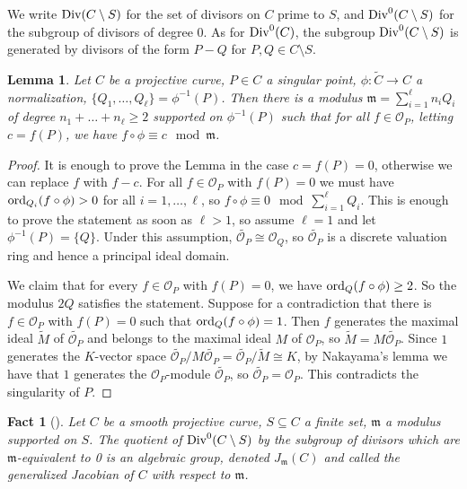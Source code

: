\documentclass{amsart}
\theoremstyle{plain}
\newtheorem{fact}[thm]{Fact}
\newtheorem{lem}[thm]{Lemma}
\theoremstyle{definition}
\newcommand{\Div}{\textnormal{Div}}
\newcommand{\ord}{\textnormal{ord}}
\begin{document}
We write $\Div(C \setminus S)$ for the set of divisors on $C$ prime to $S$, and $\Div^0(C \setminus S)$ for the subgroup of divisors of degree $0$. As for $\Div^0(C)$, the subgroup $\Div^0(C \setminus S)$ is generated by divisors of the form $P-Q$ for $P,Q \in C \setminus S$. 

\begin{lem}\label{lem:existence-modulus}
	Let $C$ be a projective curve, $P \in C$ a singular point, $\phi:\tilde{C} \rightarrow C$ a normalization, $\{Q_1,\dots,Q_\ell\}=\phi^{-1}(P)$. Then there is a modulus $\mathfrak m =   \sum_{i=1}^{\ell} n_i Q_i$ of degree  $n_1+\dots+n_\ell \geq 2$ supported on $\phi^{-1}(P)$ such that for all $f \in \mathcal{O}_P$, letting $c = f(P)$, we have $f \circ \phi  \equiv c \mod  \mathfrak m$.
\end{lem} 

\begin{proof} It is enough to prove the Lemma in the case $c = f(P) = 0$, otherwise we can replace $f$ with $f-c$.
	For all $f \in \mathcal{O}_P$ with $f(P)=0$ we must have $\ord_{Q_i}(f \circ \phi) > 0$ for all $i=1, \ldots, \ell$, so $f \circ \phi \equiv 0 \mod \sum_{i=1}^\ell Q_i$. This is enough to prove the statement as soon as $\ell >1$, so assume $\ell=1$ and let $\phi^{-1}(P)=\{Q\}$. Under this assumption, $\widetilde{\mathcal{O}_P} \cong \mathcal{O}_Q$, so $\widetilde{\mathcal O_P}$ is a discrete valuation ring and hence a principal ideal domain. 
	
	We claim that for every $f \in \mathcal{O}_P$ with $f(P) = 0$, we have $\ord_Q(f \circ \phi) \geq 2$. So the modulus $2Q$ satisfies the statement.
	Suppose for a contradiction that there is $f \in \mathcal{O}_P$ with $f(P) = 0$ such that $\ord_Q(f \circ \phi)=1$. Then $f$ generates the maximal ideal $\widetilde M$ of $\widetilde{\mathcal O_P}$ and belongs to the maximal ideal $M$ of $\mathcal{O}_P$, so $\widetilde{M}=M\widetilde{\mathcal{O}_P}$. Since $1$ generates the $K$-vector space $\widetilde{\mathcal{O}_P}/M\widetilde{\mathcal{O}_P} = \widetilde{\mathcal{O}_P}/\widetilde{M} \cong K$, by Nakayama's lemma \cite[Corollary 4.8]{Eis} we have that $1$ generates the $\mathcal{O}_P$-module $\widetilde{\mathcal{O}_P}$, so $\widetilde{\mathcal{O}_P}=\mathcal{O}_P$. This contradicts the singularity of $P$.		
\end{proof}

\begin{fact}[{\cite[Ch.~V.9 Theorem 1, p.88]{Serre}}]
	Let $C$ be a smooth projective curve, $S \subseteq C$ a finite set, $\mathfrak{m}$ a modulus supported on $S$. The quotient of $\Div^{0}(C \setminus S)$ by the subgroup of divisors which are $\mathfrak{m}$-equivalent to 0 is an algebraic group, denoted $J_{\mathfrak{m}}(C)$ and called the generalized Jacobian of $C$ with respect to $\mathfrak{m}$.
\end{fact}
\end{document}
